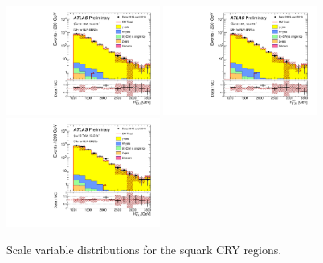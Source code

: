 \begin{figure}[tbp]
\begin{center}
\includegraphics[width=0.45\textwidth]{figures/ATLAS-CONF-2016-078_INT/N-1Plots/AtlasStyle/Preliminary/CRY_SRJigsawSRS2b_LastCut_CRY_minusone}
\includegraphics[width=0.45\textwidth]{figures/ATLAS-CONF-2016-078_INT/N-1Plots/AtlasStyle/Preliminary/CRY_SRJigsawSRS3a_LastCut_CRY_minusone}
\includegraphics[width=0.45\textwidth]{figures/ATLAS-CONF-2016-078_INT/N-1Plots/AtlasStyle/Preliminary/CRY_SRJigsawSRS3b_LastCut_CRY_minusone}
\end{center}
\caption{Scale variable distributions for the squark CRY regions.}
\label{fig:CRY_SRJigsawSRS1a_LastCut_CRY_minusone}
\end{figure}

